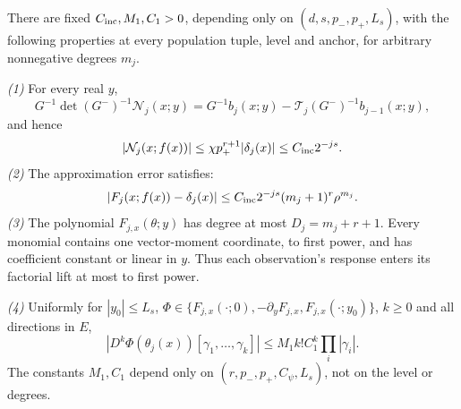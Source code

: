 \begin{lemma}\label{lem:U5}
There are fixed $C_{\rm inc},M_1,C_1>0$, depending only on
$(d,s,p_-,p_+,L_s)$, with the following properties at every population
tuple, level and anchor, for arbitrary nonnegative degrees $m_j$.

\emph{(1)} For every real $y$,
\begin{equation}\label{eq:U5-identity}
 G^{-1}\det(G^-)^{-1}\mathcal N_j(x;y)
 =G^{-1}b_j(x;y)-\mathcal T_j(G^-)^{-1}b_{j-1}(x;y),
\end{equation}
and hence
\begin{equation}\label{eq:U5-N}
 |\mathcal N_j(x;f(x))|
 \le\chi p_+^{r+1}|\delta_j(x)|\le C_{\rm inc}2^{-js}.
\end{equation}
\emph{(2)} The approximation error satisfies:
\begin{equation}\label{eq:U5-error}
 |F_j(x;f(x))-\delta_j(x)|
 \le C_{\rm inc}2^{-js}(m_j+1)^r\rho^{m_j}.
\end{equation}
\emph{(3)} The polynomial $F_{j,x}(\theta;y)$ has degree at most
$D_j=m_j+r+1$. Every monomial contains one vector-moment coordinate,
to first power, and has coefficient constant or linear in $y$.
Thus each observation's response enters its factorial lift at most
to first power.

\emph{(4)} Uniformly for $|y_0|\le L_s$,
$\Phi\in\{F_{j,x}(\cdot;0),-\partial_yF_{j,x},
F_{j,x}(\cdot;y_0)\}$, $k\ge0$ and all directions in $E$,
\begin{equation}\label{eq:U5-deriv}
 |D^k\Phi(\theta_j(x))[\gamma_1,\ldots,\gamma_k]|
 \le M_1 k!C_1^k\prod_i|\gamma_i|.
\end{equation}
The constants $M_1,C_1$ depend only on
$(r,p_-,p_+,C_\psi,L_s)$, not on the level or degrees.
\end{lemma}

